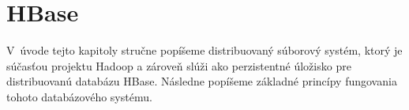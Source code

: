 \documentclass[11pt,twoside,a4paper]{book}
\begin{document}
% 
% 
% 
% 
% 
% 
% 
% 
% 
% 
% 
% 
% 
% 

\chapter{HBase}
V~úvode tejto kapitoly stručne popíšeme distribuovaný súborový systém, ktorý je súčasťou projektu Hadoop a zároveň slúži ako perzistentné úložisko pre distribuovanú databázu HBase. Následne popíšeme základné princípy fungovania tohoto databázového systému.
\end{document}
